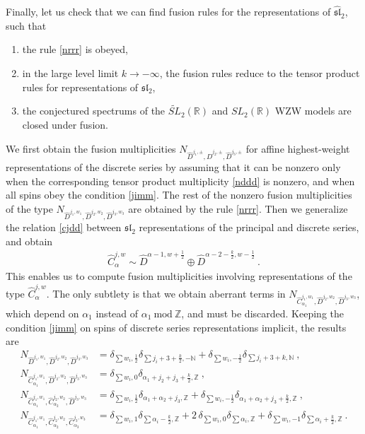 \documentclass[12pt, a4paper, notitlepage, twoside]{report}
\numberwithin{equation}{section}
\theoremstyle{break}
\begin{document}
Finally, let us check that we can find fusion rules for the representations of $\widehat{\mathfrak{sl}}_2$, such that
\begin{enumerate}
 \item the rule \eqref{nrrr} is obeyed,
\item in the large level limit $k\to -\infty$, the fusion rules reduce to the tensor product rules for representations of $\mathfrak{sl}_2$,
\item the conjectured spectrums of the $\widetilde{SL}_2(\mathbb{R})$ and $SL_2(\mathbb{R})$ WZW models are closed under fusion.
\end{enumerate}
We first obtain the fusion multiplicities $N_{\hat{D}^{j_1,\pm},\hat{D}^{j_2,\pm},\hat{D}^{j_3,\pm}}$ for affine highest-weight representations of the discrete series  by assuming that it can be nonzero only when the corresponding tensor product multiplicity \eqref{nddd} is nonzero, and when all spins obey the condition \eqref{jimm}.
The rest of the nonzero fusion multiplicities of the type    
$N_{\hat{D}^{j_1,w_1},\hat{D}^{j_2,w_2},\hat{D}^{j_3,w_3}}$ are obtained by the rule \eqref{nrrr}.
Then we generalize the relation \eqref{cjdd} between $\mathfrak{sl}_2$ representations of the principal and discrete series, and obtain 
\begin{align}
 \hat{C}^{j,w}_\alpha \sim \hat{D}^{\alpha-1,w+\frac12} \oplus \hat{D}^{\alpha-2-\frac{k}{2},w-\frac12} \ .
\end{align}
This enables us to compute fusion multiplicities involving representations of the type $\hat{C}^{j,w}_\alpha$.
The only subtlety is that we obtain aberrant terms in $N_{\hat{C}^{j_1,w_1}_{\alpha_1},\hat{D}^{j_2,w_2},\hat{D}^{j_3,w_3}}$, which depend on $\alpha_1$ instead of $\alpha_1\ \text{mod}\ {\mathbb{Z}}$, and must be discarded.
Keeping the condition \eqref{jimm} on spins of discrete series representations implicit, the results are 
\begin{align}
 N_{\hat{D}^{j_1,w_1},\hat{D}^{j_2,w_2},\hat{D}^{j_3,w_3}} 
&= \delta_{\sum w_i,\frac12} \delta_{\sum j_i+3+\frac{k}{2},-{\mathbb{N}}} + \delta_{\sum w_i,-\frac12}\delta_{\sum j_i+3+k,{\mathbb{N}}} \ ,
\\
 N_{\hat{C}^{j_1,w_1}_{\alpha_1},\hat{D}^{j_2,w_2},\hat{D}^{j_3,w_3}} &= \delta_{\sum w_i,0} \delta_{\alpha_1+j_2+j_3+\frac{k}{2},{\mathbb{Z}}}\ ,
\\
 N_{\hat{C}^{j_1,w_1}_{\alpha_1},\hat{C}^{j_2,w_2}_{\alpha_2},\hat{D}^{j_3,w_3}} & = \delta_{\sum w_i,\frac12} \delta_{\alpha_1+\alpha_2+j_3,{\mathbb{Z}}} + \delta_{\sum w_i,-\frac12}\delta_{\alpha_1+\alpha_2+j_3+\frac{k}{2},{\mathbb{Z}}}\ ,
\\
N_{\hat{C}^{j_1,w_1}_{\alpha_1},\hat{C}^{j_2,w_2}_{\alpha_2},\hat{C}^{j_3,w_3}_{\alpha_3}} & = \delta_{\sum w_i,1}\delta_{\sum\alpha_i-\frac{k}{2},{\mathbb{Z}}} + 2\, \delta_{\sum w_i,0}\delta_{\sum \alpha_i,{\mathbb{Z}}} + \delta_{\sum w_i,-1}\delta_{\sum\alpha_i+\frac{k}{2},{\mathbb{Z}}}\ .
\end{align}
\end{document}
